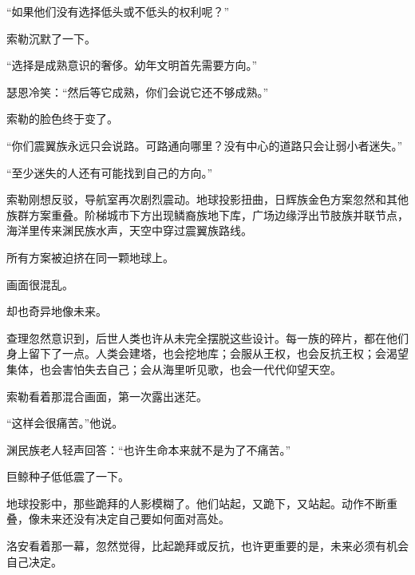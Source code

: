 “如果他们没有选择低头或不低头的权利呢？”

索勒沉默了一下。

“选择是成熟意识的奢侈。幼年文明首先需要方向。”

瑟恩冷笑：“然后等它成熟，你们会说它还不够成熟。”

索勒的脸色终于变了。

“你们震翼族永远只会说路。可路通向哪里？没有中心的道路只会让弱小者迷失。”

“至少迷失的人还有可能找到自己的方向。”

索勒刚想反驳，导航室再次剧烈震动。地球投影扭曲，日辉族金色方案忽然和其他族群方案重叠。阶梯城市下方出现鳞裔族地下库，广场边缘浮出节肢族并联节点，海洋里传来渊民族水声，天空中穿过震翼族路线。

所有方案被迫挤在同一颗地球上。

画面很混乱。

却也奇异地像未来。

查理忽然意识到，后世人类也许从未完全摆脱这些设计。每一族的碎片，都在他们身上留下了一点。人类会建塔，也会挖地库；会服从王权，也会反抗王权；会渴望集体，也会害怕失去自己；会从海里听见歌，也会一代代仰望天空。

索勒看着那混合画面，第一次露出迷茫。

“这样会很痛苦。”他说。

渊民族老人轻声回答：“也许生命本来就不是为了不痛苦。”

巨鲸种子低低震了一下。

地球投影中，那些跪拜的人影模糊了。他们站起，又跪下，又站起。动作不断重叠，像未来还没有决定自己要如何面对高处。

洛安看着那一幕，忽然觉得，比起跪拜或反抗，也许更重要的是，未来必须有机会自己决定。
